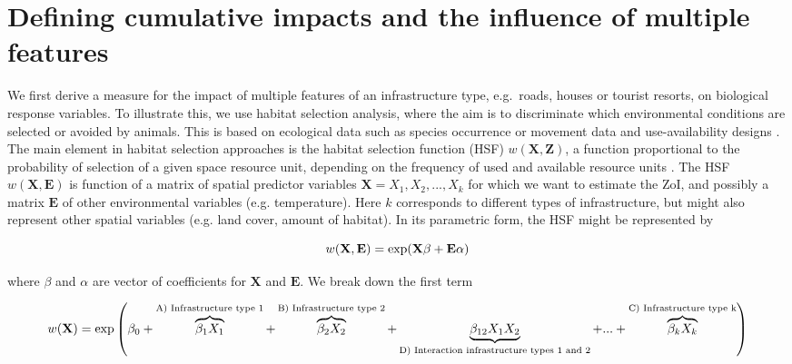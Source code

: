 \documentclass[titlepage]{article}
\begin{document}
\section{Defining cumulative impacts and the influence of multiple features}

We first derive a measure for the impact of multiple features of an infrastructure type, e.g.\ roads, houses or tourist resorts, on biological response variables. To illustrate this, we use habitat selection analysis, where the aim is to discriminate which environmental conditions are selected or avoided by animals. This is based on ecological data such as species occurrence or movement data and use-availability designs \citep{fieberg_how_2021}. The main element in habitat selection approaches is the habitat selection function (HSF) $w(\textbf{X},\textbf{Z})$, a function proportional to the probability of selection of a given space resource unit, depending on the frequency of used and available resource units \citep{thurfjell_applications_2014}. The HSF $w(\textbf{X},\textbf{E})$ is function of a matrix of spatial predictor variables $\textbf{X} = X_1,X_2, ...,  X_k$ for which we want to estimate the ZoI, and possibly a matrix $\textbf{E}$ of other environmental variables (e.g. temperature). Here $k$ corresponds to different types of infrastructure, but might also represent other spatial variables (e.g. land cover, amount of habitat). In its parametric form, the HSF might be represented by

\begin{equation}
\centering
\label{eqn:HSFgeneral}
    w(\textbf{X},\textbf{E}) = \exp (\textbf{X} \beta + \textbf{E} \alpha)
\end{equation}

where $\beta$ and $\alpha$ are vector of coefficients for $\textbf{X}$ and $\textbf{E}$. We break down the first term

\begin{equation}
\centering
\label{eqn:HSF}
    w(\textbf{X}) %
                  = \exp \left( \beta_0 + \overbrace{\beta_1 X_1}^\text{A) Infrastructure type 1} + \overbrace{\beta_2 X_2}^\text{B) Infrastructure type 2} + \underbrace{\beta_{12} X_1 X_2}_\text{D) Interaction infrastructure types 1 and 2} + ... + \overbrace{\beta_k X_k}^\text{C) Infrastructure type k} \right)
\end{equation}
\end{document}
